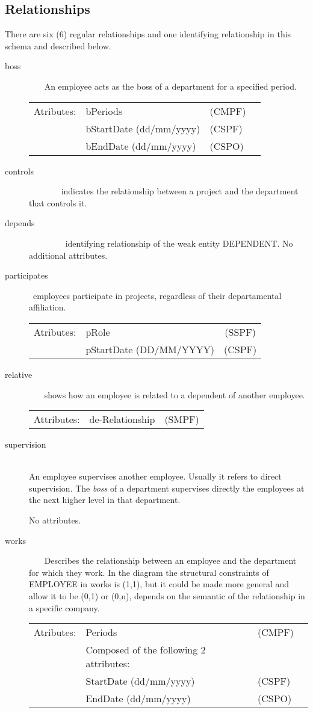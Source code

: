 \documentclass[11pt]{article}
\begin{document}
\subsection{Relationships}
\noindent
There are six (6) regular relationships and one identifying relationship in this schema and described below.
\begin{description}
\item [boss] ~~~ An employee acts as the boss of a department for a specified period.

\begin{tabular}{lllc}  
  Atributes: & bPeriods & (CMPF) \\
& bStartDate (dd/mm/yyyy) & (CSPF)\\
& bEndDate (dd/mm/yyyy) & (CSPO)
\end{tabular}
\item [controls] ~~~~~~~ indicates the relationship between a project and the department that controls it.

\item [depends] ~~~~~~~~ identifying relationship of the weak entity DEPENDENT.
No additional attributes.
\item [participates] ~employees participate in projects, regardless of their departamental affiliation. 

\begin{tabular}{llc}
 Atributes: & pRole & (SSPF) \\
            & pStartDate (DD/MM/YYYY) & (CSPF) \\
\end{tabular}
\item [relative] ~~~ shows how an employee is related to a dependent of another employee.

\begin{tabular}{llc}
  Attributes:& de-Relationship & (SMPF)
\end{tabular}

\item [supervision] ~~~\\
An employee supervises another employee. Usually it refers to direct supervision. The {\em boss} of a department supervises directly the employees at the next higher level in that department.

No attributes.
\item [works]  ~~~
Describes the relationship between an employee and the department for which they work. In the diagram the structural constraints of EMPLOYEE in works is (1,1), but it could be made more general and allow it to be (0,1) or (0,n), depends on the semantic of the relationship in a specific company.

\begin{tabular}{lllc}  
  Atributes: & Periods & (CMPF) \\
& Composed of the following 2 attributes:\\
& StartDate (dd/mm/yyyy) & (CSPF)\\
& EndDate (dd/mm/yyyy) & (CSPO)
\end{tabular}

\end{description}
\end{document}
